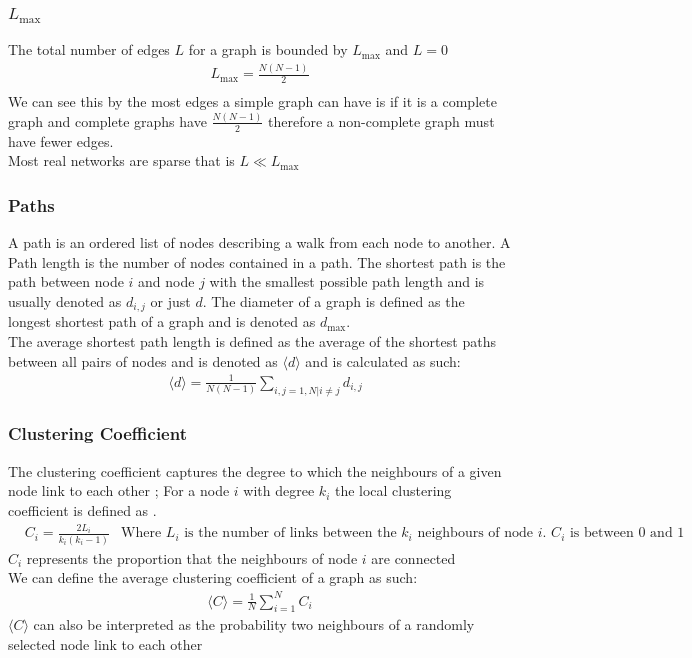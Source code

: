 \documentclass{article}
\begin{document}
        \subsubsection{$L_{\text{max}}$}
            The total number of edges $L$ for a graph is bounded by $L_{\text{max}}$ and $L=0$
            \begin{align*}
                L_{\text{max}} =  \frac{N(N-1)}{2}\\
            \end{align*}
            We can see this by the most edges a simple graph can have is if it is a complete graph and complete graphs have $\frac{N(N-1)}{2}$ therefore a non-complete graph must have fewer edges.\\
            Most real networks are sparse that is $L\ll L_{\text{max}}$\\
        \subsubsection{Paths}
        A path is an ordered list of nodes describing a walk from each node to another. A Path length is the number of nodes contained in a path. The shortest path is the path between node $i$ and node $j$ with the smallest possible path length and is usually denoted as $d_{i,j}$ or just $d$. The diameter of a graph is defined as the longest shortest path of a graph and is denoted as $d_{\text{max}}$.\\
        The average shortest path length is defined as the average of the shortest paths between all pairs of nodes and is denoted as $\langle d \rangle$ and is calculated as such:
        \begin{align*}
            &\langle d \rangle = \frac{1}{N(N-1)}\sum_{i,j=1,N | i\neq j}d_{i,j}
        \end{align*}

        \subsubsection{Clustering Coefficient}
            The clustering coefficient captures the degree to which the neighbours of a given node link to each other \parencite{barabasi2013network}; For a node $i$ with degree $k_{i}$ the local clustering coefficient is defined as \parencite{Watts1998}.
            \begin{align*}
                &C_{i} = \frac{2L_{i}}{k_{i}(k_{i}-1)} 
                &\text{Where $L_{i}$ is the number of links between the $k_i$ neighbours of node $i$. $C_{i}$ is between $0$ and $1$}
            \end{align*}
            $C_i$ represents the proportion that the neighbours of node $i$ are connected\\
            We can define the average clustering coefficient of a graph as such:
            \begin{align*}
                \langle C \rangle = \frac{1}{N}\sum_{i=1}^{N}C_{i}
            \end{align*}
            $\langle C \rangle$ can also be interpreted as the probability two neighbours of a randomly selected node link to each other
\end{document}

